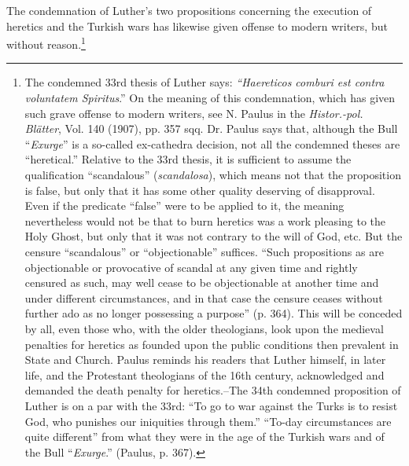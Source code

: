 The condemnation of Luther’s two propositions concerning the
execution of heretics and the Turkish wars has likewise given offense
to modern writers, but without reason.\footnote
{The condemned 33rd thesis of Luther says: \textit{``Haereticos comburi est contra voluntatem
Spiritus}.'' On the meaning of this condemnation, which has given such grave offense to
modern writers, see N. Paulus in the \textit{Histor.-pol. Blätter}, Vol. 140 (1907), pp. 357 sqq.
Dr. Paulus says that, although the Bull “\textit{Exurge}” is a so-called ex-cathedra decision, not all
the condemned theses are “heretical.” Relative to the 33rd thesis, it is sufficient to assume
the qualification “scandalous” (\textit{scandalosa}), which means not that the proposition is false,
but only that it has some other quality deserving of disapproval. Even if the predicate
“false” were to be applied to it, the meaning nevertheless would not be that to burn
heretics was a work pleasing to the Holy Ghost, but only that it was not contrary to the
will of God, etc. But the censure “scandalous” or “objectionable” suffices. “Such propositions
as are objectionable or provocative of scandal at any given time and rightly censured as such,
may well cease to be objectionable at another time and under different circumstances, and
in that case the censure ceases without further ado as no longer possessing a purpose”
(p. 364). This will be conceded by all, even those who, with the older theologians, look
upon the medieval penalties for heretics as founded upon the public conditions
then prevalent in State and Church. Paulus reminds his readers that Luther himself, in later life,
and the Protestant theologians of the 16th century, acknowledged and demanded the death
penalty for heretics.--The 34th condemned proposition of Luther is on a par with the
33rd: “To go to war against the Turks is to resist God, who punishes our iniquities
through them.” “To-day circumstances are quite different” from what they were in the
age of the Turkish wars and of the Bull ``\textit{Exurge}.'' (Paulus, p. 367).}
